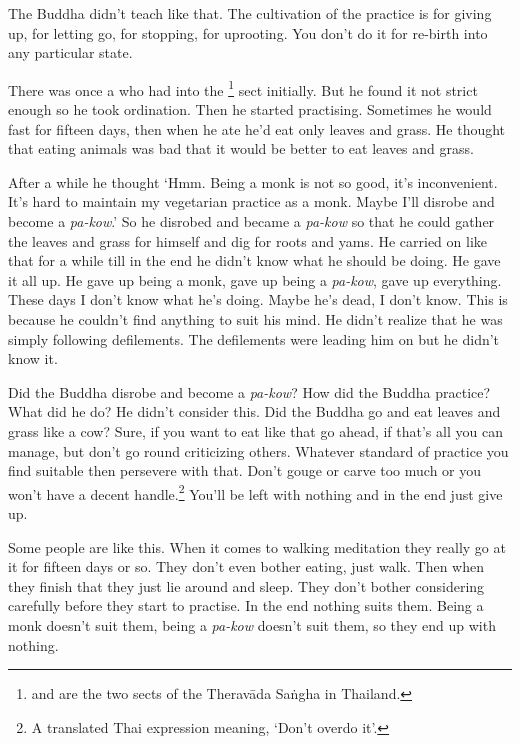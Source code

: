 The Buddha didn't teach like that. The cultivation of the practice is for giving up, for letting go, for stopping, for uprooting. You don't do it for re-birth into any particular state.

There was once a  who had  into the \footnote{ and  are the two sects of the Therav\=ada Sa\.ngha in Thailand.} sect initially. But he found it not strict enough so he took  ordination. Then he started practising. Sometimes he would fast for fifteen days, then when he ate he'd eat only leaves and grass. He thought that eating animals was bad  that it would be better to eat leaves and grass.

After a while he thought `Hmm. Being a monk is not so good, it's inconvenient. It's hard to maintain my vegetarian practice as a monk. Maybe I'll disrobe and become a \textit{pa-kow}.' So he disrobed and became a \textit{pa-kow} so that he could gather the leaves and grass for himself and dig for roots and yams. He carried on like that for a while till in the end he didn't know what he should be doing. He gave it all up. He gave up being a monk, gave up being a \textit{pa-kow}, gave up everything. These days I don't know what he's doing. Maybe he's dead, I don't know. This is because he couldn't find anything to suit his mind. He didn't realize that he was simply following defilements. The defilements were leading him on but he didn't know it.

Did the Buddha disrobe and become a \textit{pa-kow}? How did the Buddha practice? What did he do? He didn't consider this. Did the Buddha go and eat leaves and grass like a cow? Sure, if you want to eat like that go ahead, if that's all you can manage, but don't go round criticizing others. Whatever standard of practice you find suitable then persevere with that. Don't gouge or carve too much or you won't have a decent handle.\footnote{A translated Thai expression meaning, `Don't overdo it'.} You'll be left with nothing and in the end just give up.

Some people are like this. When it comes to walking meditation they really go at it for fifteen days or so. They don't even bother eating, just walk. Then when they finish that they just lie around and sleep. They don't bother considering carefully before they start to practise. In the end nothing suits them. Being a monk doesn't suit them, being a \textit{pa-kow} doesn't suit them, so they end up with nothing.

